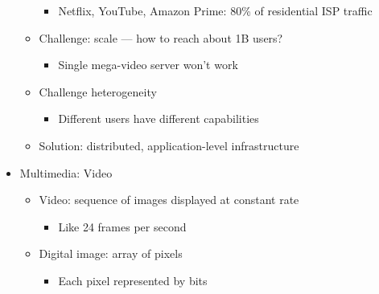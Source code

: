 \begin{itemize}
\begin{itemize}
\begin{itemize}
          \item Netflix, YouTube, Amazon Prime: 80\% of residential ISP traffic

        \end{itemize}

      \item Challenge: scale — how to reach about 1B users?

        \begin{itemize}

          \item Single mega-video server won't work

        \end{itemize}

      \item Challenge heterogeneity

        \begin{itemize}

          \item Different users have different capabilities

        \end{itemize}

      \item Solution: distributed, application-level infrastructure

    \end{itemize}

  \item Multimedia: Video

    \begin{itemize}

      \item Video: sequence of images displayed at constant rate

        \begin{itemize}

          \item Like 24 frames per second

        \end{itemize}

      \item Digital image: array of pixels

        \begin{itemize}

          \item Each pixel represented by bits

        \end{itemize}


\end{itemize}
\end{itemize}
